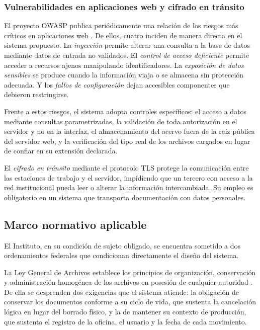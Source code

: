\subsubsection{Vulnerabilidades en aplicaciones web y cifrado en tránsito}

El proyecto OWASP publica periódicamente una relación de los riesgos más críticos en aplicaciones web \cite{owasp2021}. De ellos, cuatro inciden de manera directa en el sistema propuesto. La \emph{inyección} permite alterar una consulta a la base de datos mediante datos de entrada no validados. El \emph{control de acceso deficiente} permite acceder a recursos ajenos manipulando identificadores. La \emph{exposición de datos sensibles} se produce cuando la información viaja o se almacena sin protección adecuada. Y los \emph{fallos de configuración} dejan accesibles componentes que debieron restringirse.

Frente a estos riesgos, el sistema adopta controles específicos: el acceso a datos mediante consultas parametrizadas, la validación de toda autorización en el servidor y no en la interfaz, el almacenamiento del acervo fuera de la raíz pública del servidor web, y la verificación del tipo real de los archivos cargados en lugar de confiar en su extensión declarada.

El \emph{cifrado en tránsito} mediante el protocolo TLS protege la comunicación entre las estaciones de trabajo y el servidor, impidiendo que un tercero con acceso a la red institucional pueda leer o alterar la información intercambiada. Su empleo es obligatorio en un sistema que transporta documentación con datos personales.

\subsection{Marco normativo aplicable}
\label{subsec:mt_normativo}

El Instituto, en su condición de sujeto obligado, se encuentra sometido a dos ordenamientos federales que condicionan directamente el diseño del sistema.

La Ley General de Archivos establece los principios de organización, conservación y administración homogénea de los archivos en posesión de cualquier autoridad \cite{lga2018}. De ella se desprenden dos exigencias que el sistema atiende: la obligación de conservar los documentos conforme a su ciclo de vida, que sustenta la cancelación lógica en lugar del borrado físico, y la de mantener su contexto de producción, que sustenta el registro de la oficina, el usuario y la fecha de cada movimiento.

